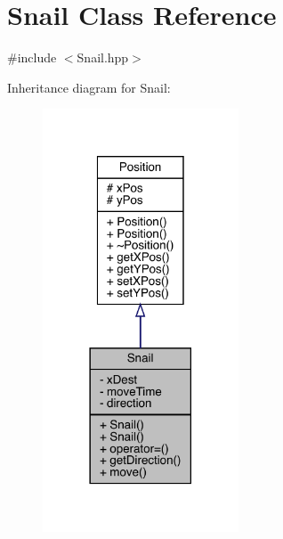 \hypertarget{class_snail}{}\section{Snail Class Reference}
\label{class_snail}


{\ttfamily \#include $<$Snail.\+hpp$>$}



Inheritance diagram for Snail\+:
\nopagebreak
\begin{figure}[H]
\begin{center}
\leavevmode
\includegraphics[width=165pt]{class_snail__inherit__graph}
\end{center}
\end{figure}


